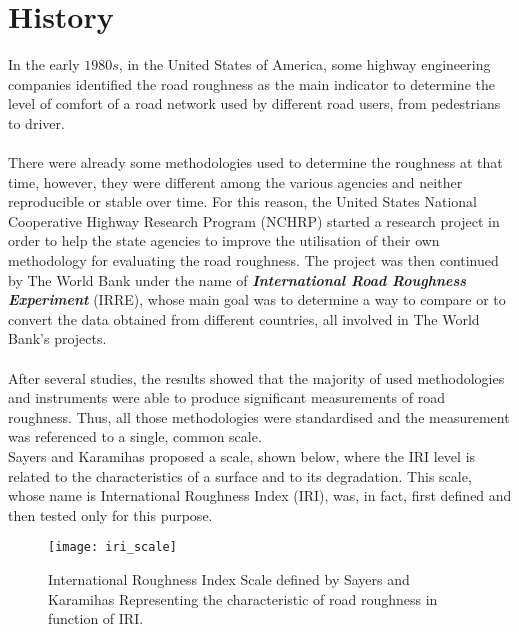 \documentclass[tesi]{subfiles}
\begin{document}
\section{History}\label{sc:IRI_History}
\noindent In the early $1980s$, in the United States of America, some highway engineering companies identified the road roughness as the main indicator to determine the level of comfort of a road network used by different road users, from pedestrians to driver. \\\\ \noindent There were already some methodologies used to determine the roughness at that time, however, they were different among the various agencies and neither reproducible or stable over time. 
For this reason, the United States National Cooperative Highway Research Program (NCHRP) started a research project in order to help the state agencies to improve the utilisation of their own methodology for evaluating the road roughness\cite{gillespie1980calibration}. The project was then continued by The World Bank\cite{sayers1986guidelines} under the name of \textbf{\textit{International Road Roughness Experiment}} (IRRE)\cite{sayers1986internationalscale}, whose main goal was to determine a way to compare or to convert the data obtained from different countries, all involved in The World Bank's projects.\\\\
After several studies, the results showed that the majority of used methodologies and instruments were able to produce significant measurements\cite{sayers1986international} of road roughness. Thus, all those methodologies were standardised and the measurement was referenced to a single, common scale.\\
Sayers and Karamihas\cite{little_book} proposed a scale, shown below, where the IRI level is related to the characteristics of a surface and to its degradation. This scale, whose name is International Roughness Index (IRI), was, in fact, first defined and then tested only for this purpose.
\\
\begin{figure}[H]
\texttt{[image: iri\_scale]}
\caption{International Roughness Index Scale defined by Sayers and Karamihas \cite{little_book}
Representing the characteristic of road roughness in function of IRI.}
\label{fig:International Roughness Index Scale}
\end{figure}
\clearpage
\end{document}
